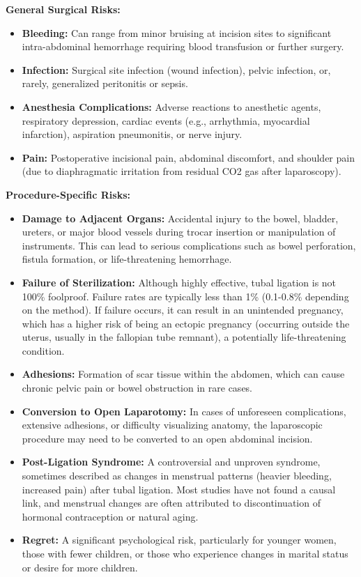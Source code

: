 \textbf{General Surgical Risks:}
\begin{itemize}
  \item \textbf{Bleeding:} Can range from minor bruising at incision sites to significant intra-abdominal hemorrhage requiring blood transfusion or further surgery.
  \item \textbf{Infection:} Surgical site infection (wound infection), pelvic infection, or, rarely, generalized peritonitis or sepsis.
  \item \textbf{Anesthesia Complications:} Adverse reactions to anesthetic agents, respiratory depression, cardiac events (e.g., arrhythmia, myocardial infarction), aspiration pneumonitis, or nerve injury.
  \item \textbf{Pain:} Postoperative incisional pain, abdominal discomfort, and shoulder pain (due to diaphragmatic irritation from residual CO2 gas after laparoscopy).
\end{itemize}

\textbf{Procedure-Specific Risks:}
\begin{itemize}
  \item \textbf{Damage to Adjacent Organs:} Accidental injury to the bowel, bladder, ureters, or major blood vessels during trocar insertion or manipulation of instruments. This can lead to serious complications such as bowel perforation, fistula formation, or life-threatening hemorrhage.
  \item \textbf{Failure of Sterilization:} Although highly effective, tubal ligation is not 100\% foolproof. Failure rates are typically less than 1\% (0.1-0.8\% depending on the method). If failure occurs, it can result in an unintended pregnancy, which has a higher risk of being an ectopic pregnancy (occurring outside the uterus, usually in the fallopian tube remnant), a potentially life-threatening condition.
  \item \textbf{Adhesions:} Formation of scar tissue within the abdomen, which can cause chronic pelvic pain or bowel obstruction in rare cases.
  \item \textbf{Conversion to Open Laparotomy:} In cases of unforeseen complications, extensive adhesions, or difficulty visualizing anatomy, the laparoscopic procedure may need to be converted to an open abdominal incision.
  \item \textbf{Post-Ligation Syndrome:} A controversial and unproven syndrome, sometimes described as changes in menstrual patterns (heavier bleeding, increased pain) after tubal ligation. Most studies have not found a causal link, and menstrual changes are often attributed to discontinuation of hormonal contraception or natural aging.
  \item \textbf{Regret:} A significant psychological risk, particularly for younger women, those with fewer children, or those who experience changes in marital status or desire for more children.
\end{itemize}

